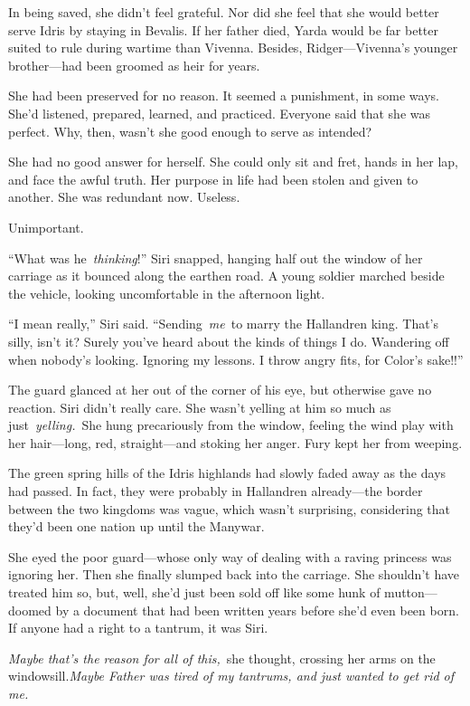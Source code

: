 In being saved, she didn’t feel grateful. Nor did she feel that she would better serve Idris by staying in Bevalis. If her father died, Yarda would be far better suited to rule during wartime than Vivenna. Besides, Ridger—Vivenna’s younger brother—had been groomed as heir for years.

She had been preserved for no reason. It seemed a punishment, in some ways. She’d listened, prepared, learned, and practiced. Everyone said that she was perfect. Why, then, wasn’t she good enough to serve as intended?

She had no good answer for herself. She could only sit and fret, hands in her lap, and face the awful truth. Her purpose in life had been stolen and given to another. She was redundant now. Useless.

Unimportant.

\orn

“What was he~\textit{thinking}!” Siri snapped, hanging half out the window of her carriage as it bounced along the earthen road. A young soldier marched beside the vehicle, looking uncomfortable in the afternoon light.

“I mean really,” Siri said. “Sending~\textit{me}~to marry the Hallandren king. That’s silly, isn’t it? Surely you’ve heard about the kinds of things I do. Wandering off when nobody’s looking. Ignoring my lessons. I throw angry fits, for Color’s sake!!”

The guard glanced at her out of the corner of his eye, but otherwise gave no reaction. Siri didn’t really care. She wasn’t yelling at him so much as just~\textit{yelling.}~She hung precariously from the window, feeling the wind play with her hair—long, red, straight—and stoking her anger. Fury kept her from weeping.

The green spring hills of the Idris highlands had slowly faded away as the days had passed. In fact, they were probably in Hallandren already—the border between the two kingdoms was vague, which wasn’t surprising, considering that they’d been one nation up until the Manywar.

She eyed the poor guard—whose only way of dealing with a raving princess was ignoring her. Then she finally slumped back into the carriage. She shouldn’t have treated him so, but, well, she’d just been sold off like some hunk of mutton—doomed by a document that had been written years before she’d even been born. If anyone had a right to a tantrum, it was Siri.

\textit{Maybe that’s the reason for all of this,}~she thought, crossing her arms on the windowsill.\textit{Maybe Father was tired of my tantrums, and just wanted to get rid of me.}

